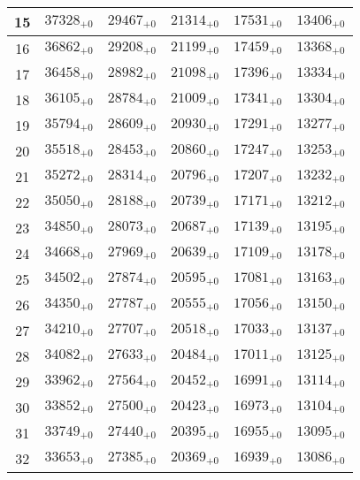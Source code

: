 \documentclass[10pt, a4paper]{article}
\begin{document}
\begin{center}
\begin{tabular}{c || c c c c c}
        15 & \({37328}_{+0}\) & \({29467}_{+0}\) & \({21314}_{+0}\) & \({17531}_{+0}\) & \({13406}_{+0}\)\\
        \hline
        16 & \({36862}_{+0}\) & \({29208}_{+0}\) & \({21199}_{+0}\) & \({17459}_{+0}\) & \({13368}_{+0}\)\\
        17 & \({36458}_{+0}\) & \({28982}_{+0}\) & \({21098}_{+0}\) & \({17396}_{+0}\) & \({13334}_{+0}\)\\
        18 & \({36105}_{+0}\) & \({28784}_{+0}\) & \({21009}_{+0}\) & \({17341}_{+0}\) & \({13304}_{+0}\)\\
        19 & \({35794}_{+0}\) & \({28609}_{+0}\) & \({20930}_{+0}\) & \({17291}_{+0}\) & \({13277}_{+0}\)\\
        20 & \({35518}_{+0}\) & \({28453}_{+0}\) & \({20860}_{+0}\) & \({17247}_{+0}\) & \({13253}_{+0}\)\\
        \hline
        21 & \({35272}_{+0}\) & \({28314}_{+0}\) & \({20796}_{+0}\) & \({17207}_{+0}\) & \({13232}_{+0}\)\\
        22 & \({35050}_{+0}\) & \({28188}_{+0}\) & \({20739}_{+0}\) & \({17171}_{+0}\) & \({13212}_{+0}\)\\
        23 & \({34850}_{+0}\) & \({28073}_{+0}\) & \({20687}_{+0}\) & \({17139}_{+0}\) & \({13195}_{+0}\)\\
        24 & \({34668}_{+0}\) & \({27969}_{+0}\) & \({20639}_{+0}\) & \({17109}_{+0}\) & \({13178}_{+0}\)\\
        25 & \({34502}_{+0}\) & \({27874}_{+0}\) & \({20595}_{+0}\) & \({17081}_{+0}\) & \({13163}_{+0}\)\\
        \hline
        26 & \({34350}_{+0}\) & \({27787}_{+0}\) & \({20555}_{+0}\) & \({17056}_{+0}\) & \({13150}_{+0}\)\\
        27 & \({34210}_{+0}\) & \({27707}_{+0}\) & \({20518}_{+0}\) & \({17033}_{+0}\) & \({13137}_{+0}\)\\
        28 & \({34082}_{+0}\) & \({27633}_{+0}\) & \({20484}_{+0}\) & \({17011}_{+0}\) & \({13125}_{+0}\)\\
        29 & \({33962}_{+0}\) & \({27564}_{+0}\) & \({20452}_{+0}\) & \({16991}_{+0}\) & \({13114}_{+0}\)\\
        30 & \({33852}_{+0}\) & \({27500}_{+0}\) & \({20423}_{+0}\) & \({16973}_{+0}\) & \({13104}_{+0}\)\\
        \hline
        31 & \({33749}_{+0}\) & \({27440}_{+0}\) & \({20395}_{+0}\) & \({16955}_{+0}\) & \({13095}_{+0}\)\\
        32 & \({33653}_{+0}\) & \({27385}_{+0}\) & \({20369}_{+0}\) & \({16939}_{+0}\) & \({13086}_{+0}\)\\

\end{tabular}
\end{center}
\end{document}
